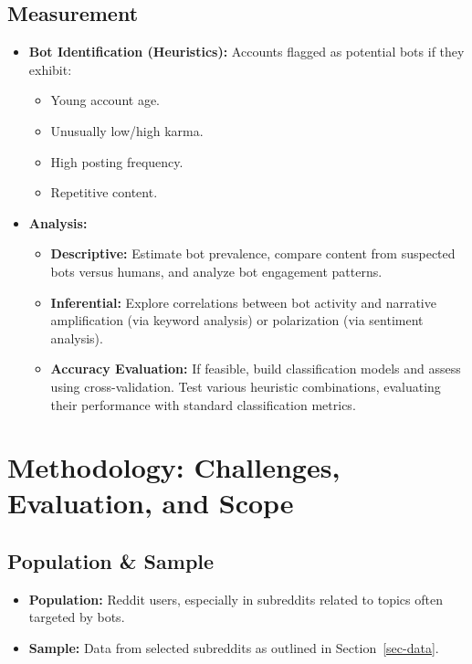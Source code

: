 \documentclass[
  letterpaper,
  DIV=11,
  numbers=noendperiod]{scrartcl}
\providecommand{\tightlist}{%
  \setlength{\itemsep}{0pt}\setlength{\parskip}{0pt}}\usepackage{longtable,booktabs,array}
\begin{document}
\subsection{Measurement}\label{measurement}

\begin{itemize}
\tightlist
\item
  \textbf{Bot Identification (Heuristics):} Accounts flagged as
  potential bots if they exhibit:

  \begin{itemize}
  \tightlist
  \item
    Young account age.
  \item
    Unusually low/high karma.
  \item
    High posting frequency.
  \item
    Repetitive content.
  \end{itemize}
\item
  \textbf{Analysis:}

  \begin{itemize}
  \tightlist
  \item
    \textbf{Descriptive:} Estimate bot prevalence, compare content from
    suspected bots versus humans, and analyze bot engagement patterns.
  \item
    \textbf{Inferential:} Explore correlations between bot activity and
    narrative amplification (via keyword analysis) or polarization (via
    sentiment analysis).
  \item
    \textbf{Accuracy Evaluation:} If feasible, build classification
    models and assess using cross-validation. Test various heuristic
    combinations, evaluating their performance with standard
    classification metrics.
  \end{itemize}
\end{itemize}

\section{Methodology: Challenges, Evaluation, and
Scope}\label{methodology-challenges-evaluation-and-scope}

\subsection{Population \& Sample}\label{population-sample}

\begin{itemize}
\tightlist
\item
  \textbf{Population:} Reddit users, especially in subreddits related to
  topics often targeted by bots.
\item
  \textbf{Sample:} Data from selected subreddits as outlined in
  Section~\ref{sec-data}.
\end{itemize}
\end{document}
